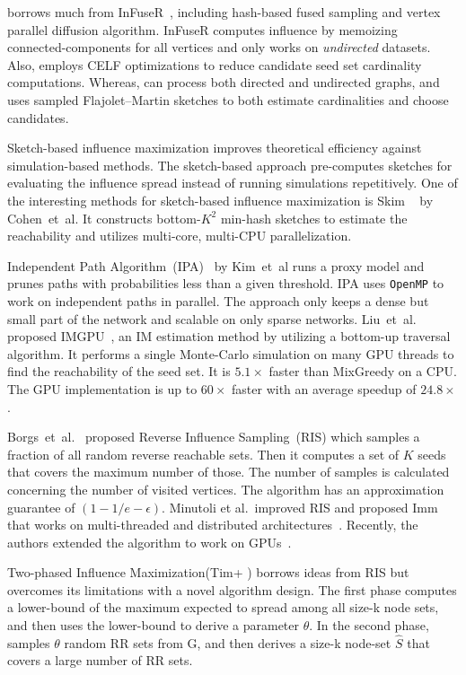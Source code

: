 \documentclass[10pt,journal,compsoc]{IEEEtran}
\newcommand\acro{{\sc{HyperFuseR\xspace}\xspace}\xspace}
\begin{document}
\acro borrows much from {\sc InFuseR}~\cite{infuser}, including hash-based fused sampling and vertex parallel diffusion algorithm. {\sc InFuseR} computes influence by memoizing connected-components for all vertices and only works on {\em undirected} datasets. Also, employs CELF optimizations to reduce candidate seed set cardinality computations. Whereas, \acro can process both directed and undirected graphs, and uses sampled Flajolet–Martin sketches to both estimate cardinalities and choose candidates. 

Sketch-based influence maximization improves theoretical efficiency against simulation-based methods. The sketch-based approach pre-computes sketches for evaluating the influence spread instead of running simulations repetitively. One of the interesting methods for sketch-based influence maximization is {\sc Skim} ~\cite{cohen2014sketch} by Cohen~et~al. It constructs bottom-$K^2$ min-hash sketches to estimate the reachability and utilizes multi-core, multi-CPU parallelization. 

Independent Path Algorithm~(IPA)~\cite{IPA} by Kim~et~al runs a proxy model and prunes paths with probabilities less than a given threshold. IPA uses {\tt OpenMP} to work on independent paths in parallel. The approach only keeps a dense but small part of the network and scalable on only sparse networks. Liu~et~al. proposed IMGPU~\cite{IMGPU}, an IM  estimation method by utilizing a bottom-up traversal algorithm. It performs a single Monte-Carlo simulation on many GPU threads to find the reachability of the seed set. It is $5.1\times$ faster than {\sc MixGreedy} on a CPU. The GPU implementation is up to $60\times$ faster with an average speedup of  $24.8\times$.

Borgs~et~al.~\cite{borgs2014maximizing} proposed Reverse Influence Sampling~(RIS) which samples a fraction of all random reverse reachable sets. Then it computes a set of $K$ seeds that covers the maximum number of those. The number of samples is calculated concerning the number of visited vertices. The algorithm has an approximation guarantee of $(1-1/e-\epsilon)$. Minutoli et al.~improved RIS and proposed {\sc Imm} that works on multi-threaded and distributed architectures~\cite{minutoli2019fast}. 
Recently, the authors extended the algorithm to work on GPUs~\cite{curipples}.   

Two-phased Influence Maximization({\sc Tim+} )\cite{tim} borrows ideas from RIS but overcomes its limitations with a novel algorithm design. The first phase computes a lower-bound of the maximum expected to spread among all size-k node sets, and then uses the lower-bound to derive a parameter $\theta$. In the second phase, samples $\theta$ random RR sets from G, and then derives a size-k node-set $\hat{S}$ that covers a large number of RR sets.
\end{document}
